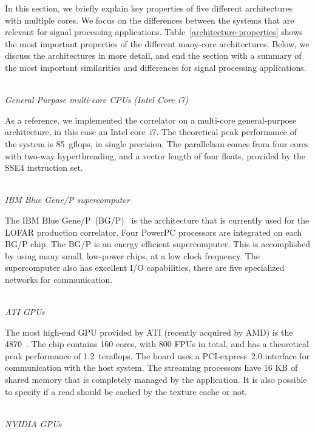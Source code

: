 \documentclass{article}
\begin{document}
In this section, we briefly explain key properties of five different
architectures with multiple cores.  We focus on the differences
between the systems that are relevant for signal processing
applications. Table~\ref{architecture-properties} shows the most
important properties of the different many-core architectures. Below,
we discuss the architectures in more detail, and end the section with
a summary of the most important similarities and differences for signal processing applications.


\noindent \\ \emph{General Purpose multi-core CPUs (Intel Core i7)}

\noindent As a reference, we implemented the correlator on a multi-core
general-purpose architecture, in this case an Intel core~i7.  The
theoretical peak performance of the system is 85~gflops, in single
precision.  The parallelism comes from four cores with two-way
hyperthreading, and a vector length of four floats, provided by the
SSE4 instruction set.

\noindent \\ \emph{IBM Blue Gene/P supercomputer}

\noindent The IBM Blue Gene/P~(BG/P)~\cite{IBM:08} is the architecture that is
currently used for the LOFAR production correlator.
Four PowerPC processors are integrated on each BG/P chip.
The BG/P is an energy efficient supercomputer.
This is accomplished by using many small, low-power chips, at a low clock
frequency.
The supercomputer also has excellent I/O capabilities, there are five
specialized networks for communication.


\noindent \\ \emph{ATI GPUs}

\noindent The most high-end GPU provided by ATI (recently acquired by AMD) is
the 4870~\cite{amd-manual}.  The chip contains 160 cores, with 800 FPUs in total, 
and has a theoretical peak performance of
1.2~teraflops. The board uses a PCI-express~2.0 interface
for communication with the host system.
The streaming processors have 16 KB of shared
memory that is completely managed by the application. It is also
possible to specify if a read should be
cached by the texture cache or not.



\noindent \\ \emph{NVIDIA GPUs}
\end{document}
